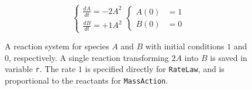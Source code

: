 \begin{figure}[t]
\begin{minipage}[t]{\linewidth}
{\begin{minipage}[c]{0.50\linewidth}
{}

\end{minipage}%

}

\end{minipage}%
\newline
\begin{minipage}[t]{\linewidth}

{\centering 

\begin{minipage}[c]{0.50\linewidth}

{\centering 

\begin{Shaded}
\begin{Highlighting}[]

\OperatorTok{=}\OperatorTok{=}\NormalTok{)}
\OperatorTok{=}\OperatorTok{=}\NormalTok{)}
\OperatorTok{=}
\OperatorTok{=}\NormalTok{[} \OperatorTok{*}\NormalTok{ A],}
\OperatorTok{=}\NormalTok{[B],}
\OperatorTok{=}\NormalTok{,}
\NormalTok{    )}
\end{Highlighting}
\end{Shaded}

}

\end{minipage}%
%
\begin{minipage}[c]{0.50\linewidth}

{\centering 

\[
\begin{cases}
    \frac{dA}{dt} = -2 A^2 \\
    \frac{dB}{dt} = +1 A^2
\end{cases}
\begin{cases}
    A(0) &= 1 \\
    B(0) &= 0
\end{cases}
\]

}

\end{minipage}%

}

\end{minipage}%

\caption{\label{fig-simbio}A reaction system for species \(A\) and \(B\)
with initial conditions \(1\) and \(0\), respectively. A single reaction
transforming \(2A\) into \(B\) is saved in variable \texttt{r}. The rate
\(1\) is specified directly for \texttt{RateLaw}, and is proportional to
the reactants for \texttt{MassAction}.}

\end{figure}
